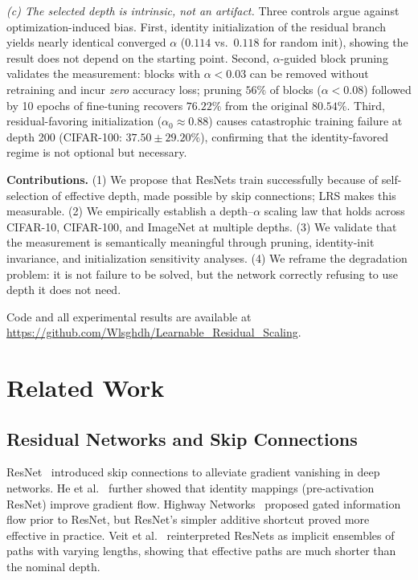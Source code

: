 \documentclass[preprint,12pt]{elsarticle}
\begin{document}
\emph{(c) The selected depth is intrinsic, not an artifact.} Three controls argue against optimization-induced bias. First, identity initialization of the residual branch yields nearly identical converged $\alpha$ ($0.114$ vs.\ $0.118$ for random init), showing the result does not depend on the starting point. Second, $\alpha$-guided block pruning validates the measurement: blocks with $\alpha < 0.03$ can be removed without retraining and incur \emph{zero} accuracy loss; pruning $56\%$ of blocks ($\alpha < 0.08$) followed by 10 epochs of fine-tuning recovers $76.22\%$ from the original $80.54\%$. Third, residual-favoring initialization ($\alpha_0 \approx 0.88$) causes catastrophic training failure at depth 200 (CIFAR-100: $37.50\pm29.20\%$), confirming that the identity-favored regime is not optional but necessary.

\textbf{Contributions.} (1) We propose that ResNets train successfully because of self-selection of effective depth, made possible by skip connections; LRS makes this measurable. (2) We empirically establish a depth--$\alpha$ scaling law that holds across CIFAR-10, CIFAR-100, and ImageNet at multiple depths. (3) We validate that the measurement is semantically meaningful through pruning, identity-init invariance, and initialization sensitivity analyses. (4) We reframe the degradation problem: it is not failure to be solved, but the network correctly refusing to use depth it does not need.

Code and all experimental results are available at \url{https://github.com/Wlsghdh/Learnable_Residual_Scaling}.

\section{Related Work}
\label{sec:related}

\subsection{Residual Networks and Skip Connections}

ResNet~\cite{he2016deep} introduced skip connections to alleviate gradient vanishing in deep networks. He et al.~\cite{he2016identity} further showed that identity mappings (pre-activation ResNet) improve gradient flow. Highway Networks~\cite{srivastava2015highway} proposed gated information flow prior to ResNet, but ResNet's simpler additive shortcut proved more effective in practice. Veit et al.~\cite{veit2016residual} reinterpreted ResNets as implicit ensembles of paths with varying lengths, showing that effective paths are much shorter than the nominal depth.
\end{document}
